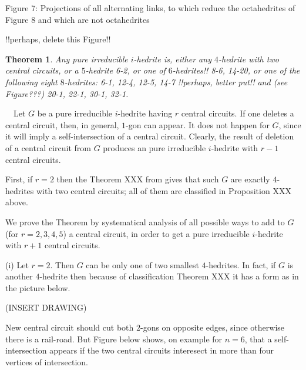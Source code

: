 \documentclass[12pt]{article}
\newtheorem{theor}{Theorem}
\newcommand{\proof}{\noindent{\bf Proof.}\ \ }
\begin{document}
\begin{center}
\mbox{}\hspace{-3.5cm}

\end{center}

\begin{center}
	Figure 7: Projections of all alternating links, 
to which reduce the octahedrites of Figure 8 and which are not
octahedrites 
\end{center}
!!perhaps, delete this Figure!!






\begin{theor}

Any pure irreducible $i$-hedrite is, either any $4$-hedrite with two central circuits, or a $5$-hedrite 6-2, or one of $6$-hedrites!! 8-6, 14-20, or one of the following eight $8$-hedrites: 6-1, 12-4, 12-5, 14-7
!!perhaps, better put!!
and (see Figure???) 20-1, 22-1, 30-1, 32-1.
\end{theor}


\proof Let $G$ be a pure irreducible $i$-hedrite having $r$ central circuits. 
If one deletes a central circuit, then, in general, $1$-gon can appear. It 
does not happen for $G$, since it will imply a self-intersection of a central 
circuit. Clearly, the result of deletion of a central circuit from $G$ 
produces an pure irreducible $i$-hedrite with $r-1$ central circuits.

First, if $r=2$ then the Theorem XXX from \cite{DSt} gives that such $G$ are 
exactly $4$-hedrites with two central circuits; all of them are classified 
in Proposition XXX above.

We prove the Theorem by systematical analysis of all possible ways to add 
to $G$ (for $r=2,3,4,5$) a central circuit, in order to get a pure 
irreducible $i$-hedrite with $r+1$ central circuits. 


(i) Let $r=2$. Then $G$ can be only one of two smallest $4$-hedrites. In 
fact, if $G$ is another $4$-hedrite then because of classification Theorem 
XXX it has a form as in the picture below.

(INSERT DRAWING)






New central circuit should cut both $2$-gons on opposite edges, since otherwise there is a rail-road. But Figure below shows, on example for $n=6$, that a self-intersection appears if the two central circuits interesect in more than four vertices of intersection.
\end{document}
